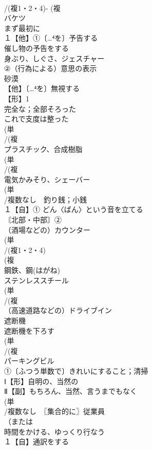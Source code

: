\documentclass[8pt]{extreport}
\begin{document}
\begin{CJK}{UTF8}{min}
\\	/(複1・2・4)- (複
\\	バケツ 
\\	まず最初に
\\	１【他】①〔…⁴を〕予告する 
\\	催し物の予告をする
\\	身ぶり、しぐさ、ジェスチャー 
\\	②（行為による）意思の表示
\\	砂漠 
\\	【他】〔…⁴を〕無視する 
\\	【形】1
\\	完全な；全部そろった 
\\	これで支度は整った
\\	(単
\\	/(複
\\	プラスチック、合成樹脂 
\\	(単
\\	/(複
\\	電気かみそり、シェーバー 
\\	(単
\\	/複数なし　釣り銭；小銭 
\\	１【自】① どん〈ばん〉という音を立てる 
\\	〘北部・中部〙②
\\	（酒場などの）カウンター 
\\	(単
\\	/(複1・2・4)
\\	(複
\\	鋼鉄、鋼(はがね) 
\\	ステンレススチール
\\	(単
\\	/(複
\\	（高速道路などの）ドライブイン 
\\	遮断機 
\\	遮断機を下ろす 
\\	(単
\\	/(複
\\	パーキングビル 
\\	①〔ふつう単数で〕きれいにすること；清掃
\\	Ⅰ【形】自明の、当然の 
\\	Ⅱ【副】もちろん、当然、言うまでもなく 
\\	(単
\\	/複数なし　〖集合的に〗従業員
\\	（または
\\	時間をかける、ゆっくり行なう
\\	１【自】通訳をする 

\end{CJK}
\end{document}
